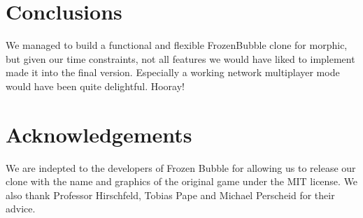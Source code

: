 \section{Conclusions}
We managed to build a functional and flexible FrozenBubble clone for morphic,
but given our time constraints, not all features we would have liked to implement
made it into the final version. Especially a working network multiplayer mode would
have been quite delightful.
Hooray!

\section*{Acknowledgements}
We are indepted to the developers of Frozen Bubble for allowing us to release 
our clone with the name and graphics of the original game under the MIT 
license. We also thank Professor Hirschfeld, Tobias Pape and Michael Perscheid for 
their advice.
